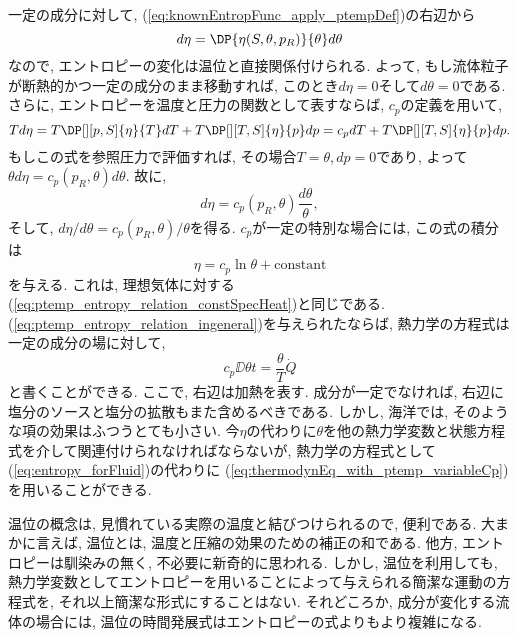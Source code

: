 一定の成分に対して, (\ref{eq:knownEntropFunc_apply_ptempDef})の右辺から
\begin{equation}
  d\eta = \DP{\eta(S,\theta,p_R)}{\theta} d\theta
\end{equation}
なので, エントロピーの変化は温位と直接関係付けられる. 
よって, もし流体粒子が断熱的かつ一定の成分のまま移動すれば, 
このとき$d\eta=0$そして$d\theta =0$である. 
さらに, エントロピーを温度と圧力の関数として表すならば, 
$c_p$の定義を用いて, 
\begin{equation}
 Td\eta = T\DP[][p,S]{\eta}{T} dT + T\DP[][T,S]{\eta}{p} dp
  = c_p dT + T\DP[][T,S]{\eta}{p} dp. 
\end{equation}
もしこの式を参照圧力で評価すれば, その場合$T=\theta, dp=0$であり, 
よって$\theta d\eta = c_p(p_R,\theta) d\theta$. 
故に, 
\begin{equation}
  \boxed{
   d\eta = c_p(p_R,\theta) \dfrac{d\theta}{\theta}, 
   \label{eq:ptemp_entropy_relation_ingeneral}
  }
\end{equation}
そして, $d\eta/d\theta = c_p(p_R,\theta) /\theta$を得る. 
$c_p$が一定の特別な場合には, この式の積分は
\begin{equation}
 \eta = c_p \ln{\theta} + \text{constant}
\end{equation}
を与える. 
これは, 理想気体に対する(\ref{eq:ptemp_entropy_relation_constSpecHeat})と同じである. 
(\ref{eq:ptemp_entropy_relation_ingeneral})を与えられたならば, 
熱力学の方程式は一定の成分の場に対して, 
\begin{equation}
 c_p \DD{\theta}{t} = \dfrac{\theta}{T} \dot{Q}
 \label{eq:thermodynEq_with_ptemp_variableCp}
\end{equation}
と書くことができる. 
ここで, 右辺は加熱を表す. 
成分が一定でなければ, 右辺に塩分のソースと塩分の拡散もまた含めるべきである. 
しかし, 海洋では, そのような項の効果はふつうとても小さい. 
今$\eta$の代わりに$\theta$を他の熱力学変数と状態方程式を介して関連付けられなければならないが, 
熱力学の方程式として(\ref{eq:entropy_forFluid})の代わりに
(\ref{eq:thermodynEq_with_ptemp_variableCp})を用いることができる. 

温位の概念は, 見慣れている実際の温度と結びつけられるので, 便利である. 
大まかに言えば, 温位とは, 温度と圧縮の効果のための補正の和である. 
他方, エントロピーは馴染みの無く, 不必要に新奇的に思われる. 
しかし, 温位を利用しても, 
熱力学変数としてエントロピーを用いることによって与えられる簡潔な運動の方程式を, 
それ以上簡潔な形式にすることはない. 
それどころか, 成分が変化する流体の場合には, 温位の時間発展式はエントロピーの式よりもより複雑になる. 

